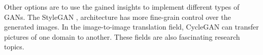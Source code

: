 Other options are to use the gained insights to implement different types of GANs. The StyleGAN \cite{stylegan}, \cite{stylegan2} architecture has more fine-grain control over the generated images. In the image-to-image translation field, CycleGAN \cite{cyclegan} can transfer pictures of one domain to another. These fields are also fascinating research topics.
